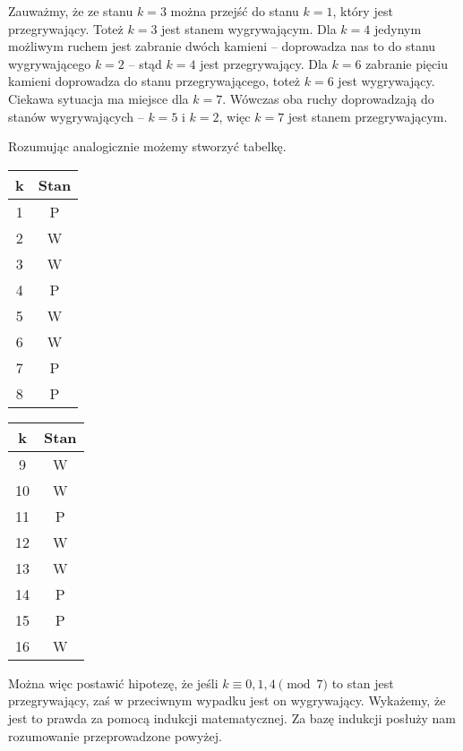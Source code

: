 \vspace{10px}
\noindent
Zauważmy, że ze stanu $k = 3$ można przejść do stanu $k = 1$, który jest przegrywający. Toteż $k = 3$ jest stanem wygrywającym. Dla $k = 4$ jedynym możliwym ruchem jest zabranie dwóch kamieni -- doprowadza nas to do stanu wygrywającego $k = 2$ -- stąd $k = 4$ jest przegrywający. Dla $k = 6$ zabranie pięciu kamieni doprowadza do stanu przegrywającego, toteż $k = 6$ jest wygrywający. Ciekawa sytuacja ma miejsce dla $k = 7$. Wówczas oba ruchy doprowadzają do stanów wygrywających -- $k = 5$ i $k = 2$, więc $k = 7$ jest stanem przegrywającym.


\vspace{10px}
\noindent
Rozumując analogicznie możemy stworzyć tabelkę.
\begin{center}
\begin{tabular}{ |c|c|} 
 \hline
 k & Stan \\ 
 \hline
 1 & P \\ 
 \hline
 2 & W \\ 
 \hline
 3 & W \\ 
 \hline
 4 & P \\ 
 \hline
 5 & W \\ 
 \hline
 6 & W \\ 
 \hline
 7 & P \\ 
 \hline
 8 & P \\ 
 \hline
\end{tabular}
\hspace{30px}
\begin{tabular}{ |c|c|} 
 \hline
 k & Stan \\ 
 \hline
 9 & W \\ 
 \hline
 10 & W \\ 
 \hline
 11 & P \\
 \hline
 12 & W \\ 
 \hline
 13 & W \\ 
 \hline
 14 & P \\ 
 \hline
 15 & P \\ 
 \hline
 16 & W \\ 
 \hline
\end{tabular}
\end{center}
Można więc postawić hipotezę, że jeśli $k \equiv 0, 1, 4 \pmod{7}$ to stan jest przegrywający, zaś w przeciwnym wypadku jest on wygrywający. Wykażemy, że jest to prawda za pomocą indukcji matematycznej. Za bazę indukcji posłuży nam rozumowanie przeprowadzone powyżej.

